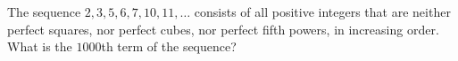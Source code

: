 The sequence $2,3,5,6,7,10,11,\dots$ consists of all positive integers that are neither perfect squares, nor perfect cubes, nor perfect fifth powers, in increasing order. What is the $1000$th term of the sequence?
